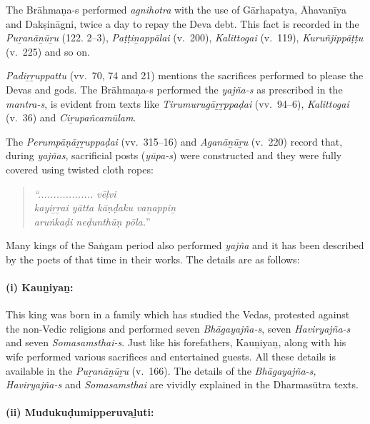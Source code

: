 The Brāhmaṇa-s performed \textit{agnihotra} with the use of Gārhapatya, Āhavanīya and Dakṣināgni, twice a day to repay the Deva debt. This fact is recorded in the \textit{Puṟanāṉūṟu} (122. 2–3), \textit{Paṭṭiṉappālai} (v.~200), \textit{Kalittogai} (v.~119), \textit{Kuruñjippāṭṭu} (v.~225) and so on.

\textit{Padiṟṟuppattu} (vv.~70, 74 and 21) mentions the sacrifices performed to please the Devas and gods. The Brāhmaṇa-s performed the \textit{yajña-s} as prescribed in the \textit{mantra-s}, is evident from texts like \textit{Tirumurugāṟṟppaḍai} (vv.~94–6), \textit{Kalittogai} (v.~36) and \textit{Ciṟupañcamūlam}.

The \textit{Perumpāṇāṟṟuppaḍai} (vv.~315–16) and \textit{Aganāṉūṟu} (v.~220) record that, during \textit{yajñas}, sacrificial posts (\textit{yūpa-s}) were constructed and they were fully covered using twisted cloth ropes:

\begin{quote}
\textit{“.................. vēḷvi}\\\textit{kayiṟṟai yātta kāṇḍaku vaṉappiṉ}\\\textit{aruṅkaḍi neḍunthūṇ pōla.}”
\end{quote}

Many kings of the Saṅgam period also performed \textit{yajña} and it has been described by the poets of that time in their works. The details are as follows:

\paragraph*{(i) Kauṉiyaṉ:}

\vskip -7pt

This king was born in a family which has studied the Vedas, protested against the non-Vedic religions and performed seven \textit{Bhāgayajña-s}, seven \textit{Haviryajña-s} and seven \textit{Somasamsthai-s}. Just like his forefathers, Kauṉiyaṉ, along with his wife performed various sacrifices and entertained guests. All these details is available in the \textit{Puṟanāṉūṟu} (v.~166). The details of the \textit{Bhāgayajña-s, Haviryajña-s} and \textit{Somasamsthai} are vividly explained in the Dharmasūtra texts.


\paragraph*{(ii) Mudukuḍumipperuvaḻuti:}

\vskip -7pt

